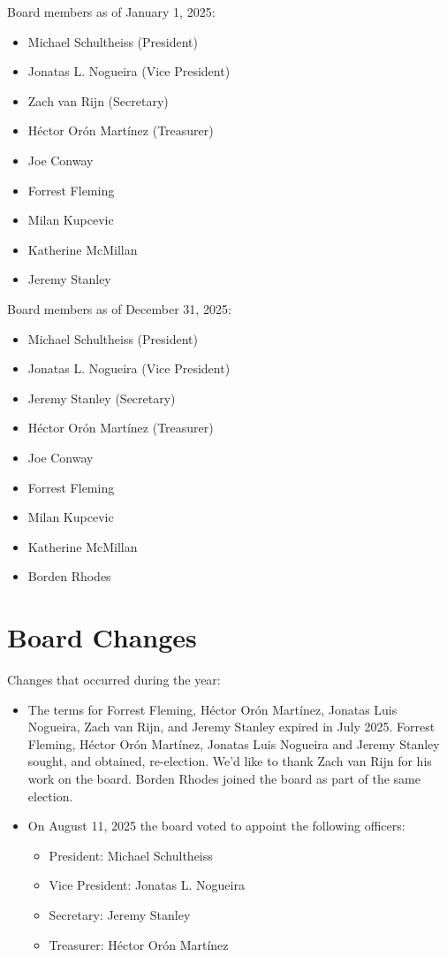 \documentclass[a4paper]{report}
\begin{document}
Board members as of January 1, 2025:

\begin{itemize}
\item Michael Schultheiss (President)
\item Jonatas L. Nogueira (Vice President)
\item Zach van Rijn (Secretary)
\item Héctor Orón Martínez (Treasurer)
\item Joe Conway
\item Forrest Fleming
\item Milan Kupcevic
\item Katherine McMillan
\item Jeremy Stanley
\end{itemize}

Board members as of December 31, 2025:

\begin{itemize}
\item Michael Schultheiss (President)
\item Jonatas L. Nogueira (Vice President)
\item Jeremy Stanley (Secretary)
\item Héctor Orón Martínez (Treasurer)
\item Joe Conway
\item Forrest Fleming
\item Milan Kupcevic
\item Katherine McMillan
\item Borden Rhodes
\end{itemize}

\section{Board Changes}

Changes that occurred during the year:

\begin{itemize}

\item The terms for Forrest Fleming, Héctor Orón Martínez, Jonatas Luis Nogueira, Zach van Rijn, and Jeremy Stanley expired in July 2025.  Forrest Fleming, Héctor Orón Martínez, Jonatas Luis Nogueira and Jeremy Stanley sought, and obtained, re-election.  We'd like to thank Zach van Rijn for his work on the board.  Borden Rhodes joined the board as part of the same election.

\item On August 11, 2025 the board voted to appoint the following officers:

\begin{itemize}
\item President: Michael Schultheiss
\item Vice President: Jonatas L. Nogueira
\item Secretary: Jeremy Stanley
\item Treasurer: Héctor Orón Martínez
\end{itemize}

\end{itemize}
\end{document}
